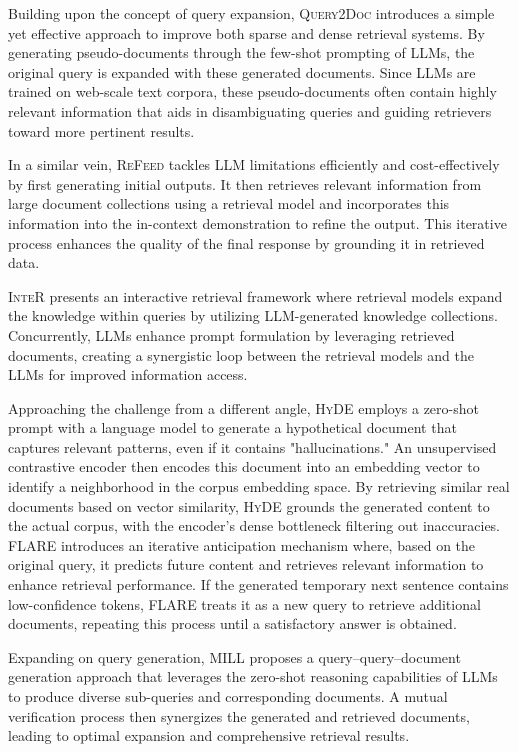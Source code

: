 \documentclass[11pt]{article}
\begin{document}
Building upon the concept of query expansion, \textsc{Query2Doc} \cite{Query2doc} introduces a simple yet effective approach to improve both sparse and dense retrieval systems. By generating pseudo-documents through the few-shot prompting of LLMs, the original query is expanded with these generated documents. Since LLMs are trained on web-scale text corpora, these pseudo-documents often contain highly relevant information that aids in disambiguating queries and guiding retrievers toward more pertinent results.

In a similar vein, \textsc{ReFeed} \cite{ReFeed} tackles LLM limitations efficiently and cost-effectively by first generating initial outputs. It then retrieves relevant information from large document collections using a retrieval model and incorporates this information into the in-context demonstration to refine the output. This iterative process enhances the quality of the final response by grounding it in retrieved data.

\textsc{InteR} \cite{InteR} presents an interactive retrieval framework where retrieval models expand the knowledge within queries by utilizing LLM-generated knowledge collections. Concurrently, LLMs enhance prompt formulation by leveraging retrieved documents, creating a synergistic loop between the retrieval models and the LLMs for improved information access.

Approaching the challenge from a different angle, \textsc{HyDE} \cite{HyDE} employs a zero-shot prompt with a language model to generate a hypothetical document that captures relevant patterns, even if it contains "hallucinations." An unsupervised contrastive encoder then encodes this document into an embedding vector to identify a neighborhood in the corpus embedding space. By retrieving similar real documents based on vector similarity, \textsc{HyDE} grounds the generated content to the actual corpus, with the encoder's dense bottleneck filtering out inaccuracies.
\textsc{FLARE} \cite{FLARE} introduces an iterative anticipation mechanism where, based on the original query, it predicts future content and retrieves relevant information to enhance retrieval performance. If the generated temporary next sentence contains low-confidence tokens, \textsc{FLARE} treats it as a new query to retrieve additional documents, repeating this process until a satisfactory answer is obtained.

Expanding on query generation, \textsc{MILL} \cite{MILL} proposes a query–query–document generation approach that leverages the zero-shot reasoning capabilities of LLMs to produce diverse sub-queries and corresponding documents. A mutual verification process then synergizes the generated and retrieved documents, leading to optimal expansion and comprehensive retrieval results.
\end{document}
